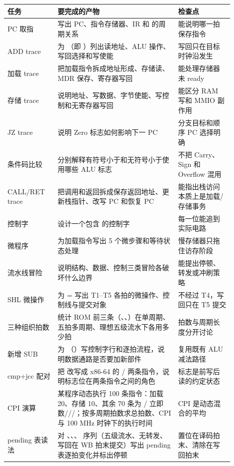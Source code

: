\begin{longtable}{L{0.2\linewidth}L{0.48\linewidth}L{0.22\linewidth}}
\toprule
任务 & 要完成的产物 & 检查点 \\
\midrule
PC 取指 & 写出 PC、指令存储器、IR 和  的周期关系 & 能说明哪一拍保存指令 \\
ADD trace & 为 （即 ）列出读地址、ALU 操作、写回选择和写使能 & 写回只在目标时钟沿发生 \\
加载 trace & 把加载指令拆成地址形成、存储读、MDR 保存、寄存器写回 & 能处理存储器未 ready \\
存储 trace & 说明地址、写数据、字节使能、写控制和无寄存器写回 & 能区分 RAM 写和 MMIO 副作用 \\
JZ trace & 说明 Zero 标志如何影响下一 PC & 分支目标和顺序 PC 选择明确 \\
条件码比较 & 分别解释有符号小于和无符号小于使用哪些 ALU 标志 & 不把 Carry、Sign 和 Overflow 混用 \\
CALL/RET trace & 把调用和返回拆成保存返回地址、更新栈指针、改写 PC 和恢复 PC & 能指出栈访问本质上是加载/存储事务 \\
控制字 & 设计一个包含  的控制字 & 每一位能追到实际电路 \\
微程序 & 为加载指令写出 5 个微步骤和等待状态处理 & 慢存储器只拖住访存阶段 \\
流水线冒险 & 说明结构、数据、控制三类冒险各破坏什么边界 & 能提出停顿、转发或冲刷策略 \\
SHL 微操作 & 为 = 写出 T1--T5 各拍的微操作、控制线与提交对象 & 不经过 T4，写回只在 T5 提交 \\
三种组织拍数 & 统计 ROM 前三条（、、）在单周期、五拍多周期、理想五级流水下各用多少拍 & 拍数与周期长度分开讨论 \\
新增 SUB & 为 （）写控制字行和逐拍流程，说明数据通路是否要加新部件 & 复用既有 ALU 减法路径 \\
cmp+jcc 配对 & 把  改写成 x86-64 的 / 两条指令，说明标志位在两条指令之间的角色 & 标志是前写后读的约定状态 \\
CPI 演算 & 某程序动态执行 100 条指令：加载 20、存储 10、其余 70 条为 / 立即数///；按多周期拍数求总拍数、CPI 与 100 MHz 时钟下的执行时间 & CPI 是动态混合的平均 \\
pending 表读法 & 对 、、、 序列（五级流水、无转发、写回在 WB 拍末提交）写出 pending 表逐拍变化并标出停顿 & 置位在译码拍末、清除在写回拍末 \\
\bottomrule
\end{longtable}

